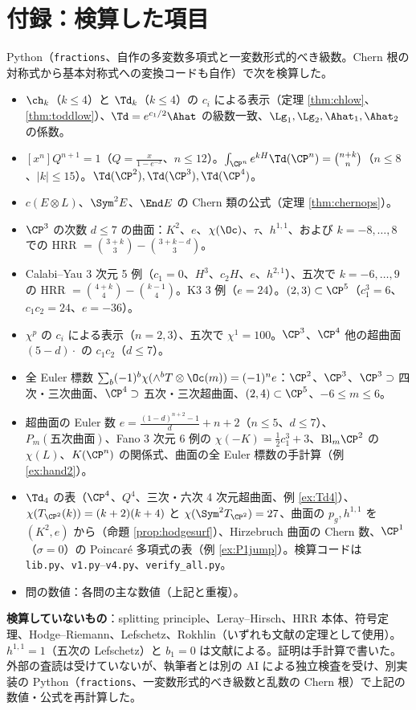 \section*{付録：検算した項目}
Python（\texttt{fractions}、自作の多変数多項式と一変数形式的べき級数。Chern 根の対称式から基本対称式への変換コードも自作）で次を検算した。
\begin{itemize}
\item $\ch_k$（$k\le4$）と $\Td_k$（$k\le4$）の $c_i$ による表示（定理 \ref{thm:chlow}、\ref{thm:toddlow}）、$\Td=e^{c_1/2}\Ahat$ の級数一致、$\Lg_1,\Lg_2,\Ahat_1,\Ahat_2$ の係数。
\item $[x^n]Q^{n+1}=1$（$Q=\frac x{1-e^{-x}}$、$n\le12$）。$\int_{\CP^n}e^{kH}\Td(\CP^n)=\binom{n+k}n$（$n\le8$、$|k|\le15$）。$\Td(\CP^2),\Td(\CP^3),\Td(\CP^4)$。
\item $c(E\otimes L)$、$\Sym^2E$、$\End E$ の Chern 類の公式（定理 \ref{thm:chernops}）。
\item $\CP^3$ の次数 $d\le7$ の曲面：$K^2$、$e$、$\chi(\Oc)$、$\tau$、$h^{1,1}$、および $k=-8,\dots,8$ での HRR $=\binom{3+k}3-\binom{3+k-d}3$。
\item Calabi--Yau 3 次元 5 例（$c_1=0$、$H^3$、$c_2H$、$e$、$h^{2,1}$）、五次で $k=-6,\dots,9$ の HRR $=\binom{4+k}4-\binom{k-1}4$。K3 3 例（$e=24$）。$(2,3)\subset\CP^5$（$c_1^3=6$、$c_1c_2=24$、$e=-36$）。
\item $\chi^p$ の $c_i$ による表示（$n=2,3$）、五次で $\chi^1=100$。$\CP^3$、$\CP^4$ 他の超曲面 $(5-d)\cdot$ の $c_1c_2$（$d\le7$）。
\item 全 Euler 標数 $\sum_b(-1)^b\chi(\wedge^bT\otimes\Oc(m))=(-1)^ne$：$\CP^2$、$\CP^3$、$\CP^3\supset$ 四次・三次曲面、$\CP^4\supset$ 五次・三次超曲面、$(2,4)\subset\CP^5$、$-6\le m\le6$。
\item 超曲面の Euler 数 $e=\frac{(1-d)^{n+2}-1}d+n+2$（$n\le5$、$d\le7$）、$P_m(\text{五次曲面})$、Fano 3 次元 6 例の $\chi(-K)=\frac12c_1^3+3$、$\mathrm{Bl}_m\CP^2$ の $\chi(L)$、$K(\CP^n)$ の関係式、曲面の全 Euler 標数の手計算（例 \ref{ex:hand2}）。\item $\Td_4$ の表（$\CP^4$、$Q^4$、三次・六次 4 次元超曲面、例 \ref{ex:Td4}）、$\chi(T_{\CP^2}(k))=(k+2)(k+4)$ と $\chi(\Sym^2T_{\CP^2})=27$、曲面の $p_g,h^{1,1}$ を $(K^2,e)$ から（命題 \ref{prop:hodgesurf}）、Hirzebruch 曲面の Chern 数、$\CP^1$（$\sigma=0$）の Poincaré 多項式の表（例 \ref{ex:P1jump}）。検算コードは \texttt{lib.py}、\texttt{v1.py}--\texttt{v4.py}、\texttt{verify\_all.py}。
\item 問の数値：各問の主な数値（上記と重複）。
\end{itemize}
\textbf{検算していないもの}：splitting principle、Leray--Hirsch、HRR 本体、符号定理、Hodge--Riemann、Lefschetz、Rokhlin（いずれも文献の定理として使用）。$h^{1,1}=1$（五次の Lefschetz）と $b_1=0$ は文献による。証明は手計算で書いた。外部の査読は受けていないが、執筆者とは別の AI による独立検査を受け、別実装の Python（\texttt{fractions}、一変数形式的べき級数と乱数の Chern 根）で上記の数値・公式を再計算した。

